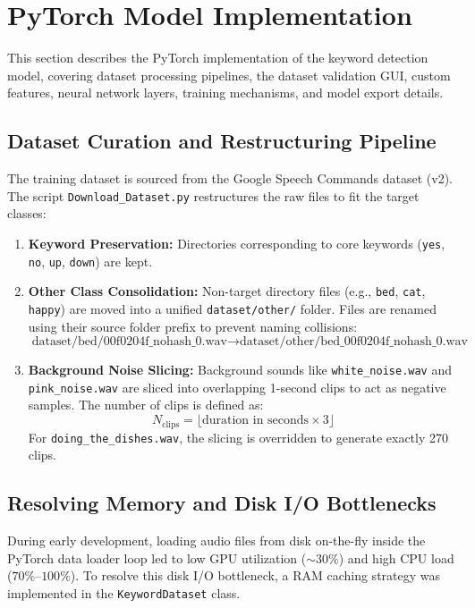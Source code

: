 \section{PyTorch Model Implementation}

This section describes the PyTorch implementation of the keyword detection model, covering dataset processing pipelines, the dataset validation GUI, custom features, neural network layers, training mechanisms, and model export details.

\subsection{Dataset Curation and Restructuring Pipeline}
The training dataset is sourced from the Google Speech Commands dataset (v2). The script \texttt{Download\_Dataset.py} restructures the raw files to fit the target classes:
\begin{enumerate}
    \item \textbf{Keyword Preservation:} Directories corresponding to core keywords (\texttt{yes}, \texttt{no}, \texttt{up}, \texttt{down}) are kept.
    \item \textbf{Other Class Consolidation:} Non-target directory files (e.g., \texttt{bed}, \texttt{cat}, \texttt{happy}) are moved into a unified \texttt{dataset/other/} folder. Files are renamed using their source folder prefix to prevent naming collisions:
    \begin{equation}
        \text{dataset/bed/00f0204f\_nohash\_0.wav} \rightarrow \text{dataset/other/bed\_00f0204f\_nohash\_0.wav}
    \end{equation}
    \item \textbf{Background Noise Slicing:} Background sounds like \texttt{white\_noise.wav} and \texttt{pink\_noise.wav} are sliced into overlapping 1-second clips to act as negative samples. The number of clips is defined as:
    \begin{equation}
        N_{\text{clips}} = \lfloor \text{duration in seconds} \times 3 \rfloor
    \end{equation}
    For \texttt{doing\_the\_dishes.wav}, the slicing is overridden to generate exactly 270 clips.
\end{enumerate}

\subsection{Resolving Memory and Disk I/O Bottlenecks}
During early development, loading audio files from disk on-the-fly inside the PyTorch data loader loop led to low GPU utilization ($\sim 30\%$) and high CPU load ($70\%$--$100\%$). To resolve this disk I/O bottleneck, a RAM caching strategy was implemented in the \texttt{KeywordDataset} class.

